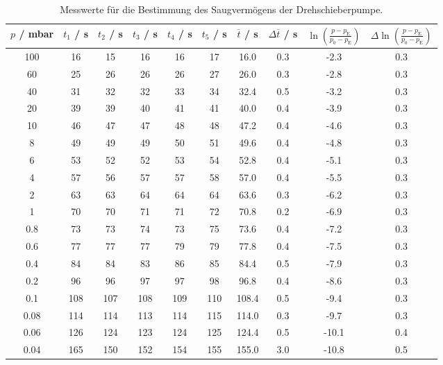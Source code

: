 \begin{table} %
  \centering
  \caption{Messwerte für die Bestimmung des Saugvermögens der Drehschieberpumpe.}
  \label{tab:ptdreh}
  \begin{tabular}{c|c|c|c|c|c|c|c|c|c}
    $p$ / mbar & $t_1$ / s & $t_2$ / s & $t_3$ / s & $t_4$ / s & $t_5$ / s & $\overline{t}$ / s & $\Delta \overline{t}$ / s & $\ln\left( \frac{p-p_\text{E}}{p_0-p_\text{E}} \right)$ & $\Delta \ln\left( \frac{p-p_\text{E}}{p_0-p_\text{E}} \right)$ \\
    \midrule
    100  & 16  & 15  & 16  & 16  & 17  & 16.0  & 0.3 & -2.3  & 0.3 \\
    60   & 25  & 26  & 26  & 26  & 27  & 26.0  & 0.3 & -2.8  & 0.3 \\
    40   & 31  & 32  & 32  & 33  & 34  & 32.4  & 0.5 & -3.2  & 0.3 \\
    \hline
    20   & 39  & 39  & 40  & 41  & 41  & 40.0  & 0.4 & -3.9  & 0.3 \\
    10   & 46  & 47  & 47  & 48  & 48  & 47.2  & 0.4 & -4.6  & 0.3 \\
    8    & 49  & 49  & 49  & 50  & 51  & 49.6  & 0.4 & -4.8  & 0.3 \\
    6    & 53  & 52  & 52  & 53  & 54  & 52.8  & 0.4 & -5.1  & 0.3 \\
    4    & 57  & 56  & 57  & 57  & 58  & 57.0  & 0.4 & -5.5  & 0.3 \\
    2    & 63  & 63  & 64  & 64  & 64  & 63.6  & 0.3 & -6.2  & 0.3 \\
    \hline
    1    & 70  & 70  & 71  & 71  & 72  & 70.8  & 0.2 & -6.9  & 0.3 \\
    0.8  & 73  & 73  & 74  & 73  & 75  & 73.6  & 0.4 & -7.2  & 0.3 \\
    0.6  & 77  & 77  & 77  & 79  & 79  & 77.8  & 0.4 & -7.5  & 0.3 \\
    0.4  & 84  & 84  & 83  & 86  & 85  & 84.4  & 0.5 & -7.9  & 0.3 \\
    0.2  & 96  & 96  & 97  & 97  & 98  & 96.8  & 0.4 & -8.6  & 0.3 \\
    \hline
    0.1  & 108 & 107 & 108 & 109 & 110 & 108.4 & 0.5 & -9.4  & 0.3 \\
    0.08 & 114 & 114 & 113 & 114 & 115 & 114.0 & 0.3 & -9.7  & 0.3 \\
    0.06 & 126 & 124 & 123 & 124 & 125 & 124.4 & 0.5 & -10.1 & 0.4 \\
    0.04 & 165 & 150 & 152 & 154 & 155 & 155.0 & 3.0 & -10.8 & 0.5 \\
  \end{tabular}
\end{table}

